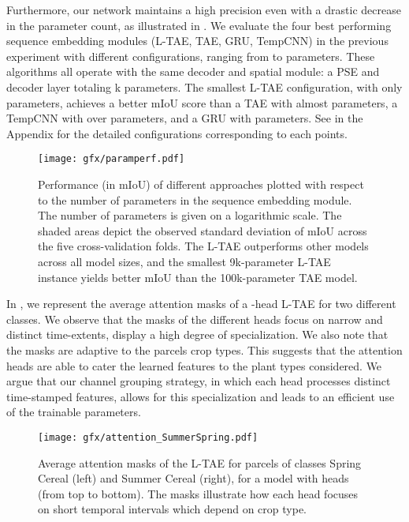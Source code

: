\documentclass[runningheads]{llncs}
\begin{document}
Furthermore, our network maintains a high precision even with a drastic decrease in the parameter count, as illustrated in .
We evaluate the four best performing sequence embedding modules (L-TAE, TAE, GRU, TempCNN) in the previous experiment with different configurations, ranging from  to  parameters. These algorithms all operate with the same decoder and spatial module: a PSE and decoder layer totaling k parameters.
The smallest L-TAE configuration, with only  parameters, achieves a better mIoU score than a TAE with almost  parameters, a TempCNN with over  parameters, and a GRU with  parameters. See  in the Appendix for the detailed configurations  corresponding to each points.
\begin{figure}[]
\texttt{[image: gfx/paramperf.pdf]}
\caption{Performance (in mIoU) of different approaches plotted with respect to the number of parameters in the sequence embedding module. The number of parameters is given on a logarithmic scale. The shaded areas depict the observed standard deviation of mIoU across the five cross-validation folds. The L-TAE outperforms other models across all model sizes, and the smallest 9k-parameter L-TAE instance yields better mIoU than the 100k-parameter TAE model.  }
\label{fig:perfparam}
\end{figure}



In , we represent the average attention masks of a -head L-TAE for two different classes. We observe that the masks of the different heads focus on narrow and distinct time-extents, \ie display a high degree of specialization. We also note that the masks are adaptive to the parcels crop types. This suggests that  the attention heads are able to cater the learned features to the plant types considered. We argue that our channel grouping strategy, in which each head processes distinct time-stamped features, allows for this specialization and leads to an efficient use of the trainable parameters.

\begin{figure}
    \centering
    \texttt{[image: gfx/attention\_SummerSpring.pdf]}
    \caption{Average attention masks of the L-TAE for parcels of classes Spring Cereal (left) and Summer Cereal (right), for a model with  heads (from top to bottom). The masks illustrate how each head focuses on short temporal intervals which depend on crop type. 
}
    \label{fig:masks}
\end{figure}
\end{document}
